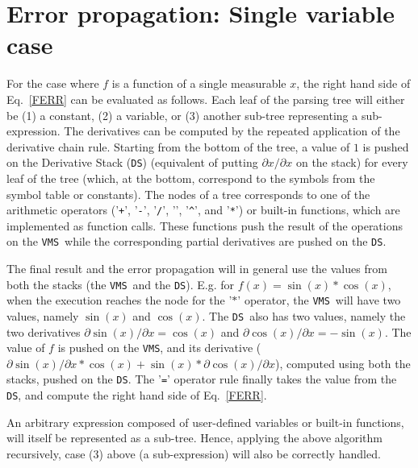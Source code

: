 \documentclass[12pt]{article}
\newcommand{\DS}{{\tt DS}}
\newcommand{\VMS}{{\tt VMS}}
\begin{document}
\section{Error propagation: Single variable case}
\label{SEC:SINGLE_VAR}

For the case where $f$ is a function of a single measurable $x$, the
right hand side of Eq.~\ref{FERR} can be evaluated as follows.  Each
leaf of the parsing tree will either be (1) a constant, (2) a
variable, or (3) another sub-tree representing a sub-expression.  The
derivatives can be computed by the repeated application of the
derivative chain rule.  Starting from the bottom of the tree, a value
of $1$ is pushed on the Derivative Stack (\DS) (equivalent of putting
$\partial x / \partial x$ on the stack) for every leaf of the tree
(which, at the bottom, correspond to the symbols from the symbol
table or constants).  The nodes of a tree corresponds to one of the
arithmetic operators ('{\tt +}', '{\tt -}', '{\tt /}', '{\tt *}',
'{\texttt {\^}}', and '{\tt **}') or built-in functions, which are
implemented as function calls.  These functions push the result of the
operations on the \VMS\ while the corresponding partial derivatives
are pushed on the \DS.

The final result and the error propagation will in general use the
values from both the stacks (the \VMS\ and the \DS).  E.g. for
$f(x)=\sin(x)*\cos(x)$, when the execution reaches the node for the
'$*$' operator, the \VMS\ will have two values, namely $\sin(x)$ and
$\cos(x)$.  The \DS\ also has two values, namely the two derivatives
$\partial \sin(x) / \partial x = \cos(x)$ and $\partial \cos(x) /
\partial x = -\sin(x)$.  The value of $f$ is pushed on the \VMS,
and its derivative ($\partial \sin(x) / \partial x * \cos(x) + \sin(x) *
\partial \cos(x) / \partial x$), computed using both the stacks, pushed
on the \DS.  The '{\tt =}' operator rule finally takes the value from
the \DS, and compute the right hand side of Eq.~\ref{FERR}.

An arbitrary expression composed of user-defined variables or built-in
functions, will itself be represented as a sub-tree.  Hence, applying
the above algorithm recursively, case (3) above (a sub-expression)
will also be correctly handled.
\end{document}
